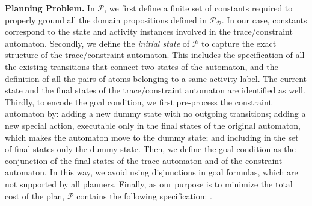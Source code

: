 \smallskip
\noindent
\textbf{Planning Problem.}
%
In $\mathcal{P}$, we first define a finite set of constants required to properly ground all the domain propositions defined in $\mathcal{P_D}$. In our case, constants correspond to the state and activity instances involved in the trace/constraint automaton.
%
Secondly, we define the \emph{initial state} of $\mathcal{P}$ to capture the exact structure of the trace/constraint automaton. This includes the specification of all the existing transitions that connect two states of the automaton, and the definition of all the pairs of atoms belonging to a same activity label. The current state and the final states of the trace/constraint automaton are identified as well.
%
Thirdly, to encode the goal condition, we first pre-process the constraint automaton by: \myi adding a new dummy state with no outgoing transitions; \myii adding a new special action, executable only in the final states of the original automaton, which makes the automaton move to the dummy state; and \myiii including in the set of final states only the dummy state. Then, we define the goal condition as the conjunction of the final states of the trace automaton and of the constraint automaton. In this way, we avoid using disjunctions in goal formulas, which are not supported by all planners.
%
Finally, as our purpose is to minimize the total cost of the plan, $\mathcal{P}$ contains the following specification: . 